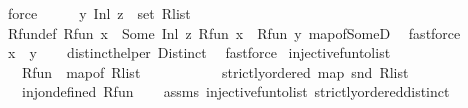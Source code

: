 \begin{isabellebody}
\ force\isanewline
\ \ \isamarkupfalse%
\ \isamarkupfalse%
\ {\isachardoublequoteopen}{\isacharparenleft}{\kern0pt}y{\isacharcomma}{\kern0pt}\ Inl\ z{\isacharparenright}{\kern0pt}\ {\isasymin}\ set\ R{\isacharunderscore}{\kern0pt}list{\isachardoublequoteclose}\ \isanewline
\ \ \ \ \isamarkupfalse%
\ R{\isacharunderscore}{\kern0pt}fun{\isacharunderscore}{\kern0pt}def\ {\isacartoucheopen}R{\isacharunderscore}{\kern0pt}fun\ x\ {\isacharequal}{\kern0pt}\ Some\ {\isacharparenleft}{\kern0pt}Inl\ z{\isacharparenright}{\kern0pt}{\isacartoucheclose}\ {\isacartoucheopen}R{\isacharunderscore}{\kern0pt}fun\ x\ {\isacharequal}{\kern0pt}\ R{\isacharunderscore}{\kern0pt}fun\ y{\isacartoucheclose}\ map{\isacharunderscore}{\kern0pt}of{\isacharunderscore}{\kern0pt}SomeD\ \isamarkupfalse%
\ fastforce\isanewline
\ \ \isamarkupfalse%
\ \isamarkupfalse%
\ {\isachardoublequoteopen}x\ {\isacharequal}{\kern0pt}\ y{\isachardoublequoteclose}\isanewline
\ \ \isamarkupfalse%
\ distinct{\isacharunderscore}{\kern0pt}helper\ Distinct\ \isamarkupfalse%
\ fastforce\isanewline
{}\isamarkupfalse%
%
\endisatagproof
{\isafoldproof}%
%
\isadelimproof
\isanewline
%
\endisadelimproof
\isanewline
{}\isamarkupfalse%
\ injective{\isacharunderscore}{\kern0pt}fun{\isacharunderscore}{\kern0pt}to{\isacharunderscore}{\kern0pt}list{\isacharunderscore}{\kern0pt}{}{\isacharcolon}{\kern0pt}\isanewline
\ \ \ {\isachardoublequoteopen}R{\isacharunderscore}{\kern0pt}fun\ {\isacharequal}{\kern0pt}\ map{\isacharunderscore}{\kern0pt}of\ R{\isacharunderscore}{\kern0pt}list{\isachardoublequoteclose}\ \isanewline
\ \ \ \ \ \ \ \ \ \ {\isachardoublequoteopen}strictly{\isacharunderscore}{\kern0pt}ordered\ {\isacharparenleft}{\kern0pt}map\ snd\ R{\isacharunderscore}{\kern0pt}list{\isacharparenright}{\kern0pt}{\isachardoublequoteclose}\isanewline
\ \ \ {\isachardoublequoteopen}inj{\isacharunderscore}{\kern0pt}on{\isacharunderscore}{\kern0pt}defined\ R{\isacharunderscore}{\kern0pt}fun{\isachardoublequoteclose}\isanewline
%
\isadelimproof
\ \ %
\endisadelimproof
%
\isatagproof
{}\isamarkupfalse%
\ assms\ injective{\isacharunderscore}{\kern0pt}fun{\isacharunderscore}{\kern0pt}to{\isacharunderscore}{\kern0pt}list\ strictly{\isacharunderscore}{\kern0pt}ordered{\isacharunderscore}{\kern0pt}distinct\ \isamarkupfalse%

\end{isabellebody}
